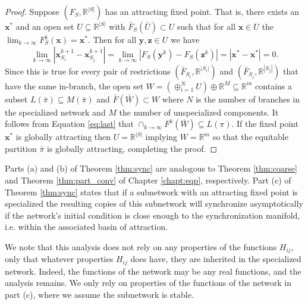 \documentclass[12pt]{thesis}
\begin{document}
\begin{proof}
Suppose $(F_{S},\mathbb{R}^{|S|})$ has an attracting fixed point.
That is, there exists an $\mathbf{x}^*$ and an open set $U\subseteq\mathbb{R}^{|S|}$ with $\bar{F}_S(\bar{U})\subset U$ such that for all {$\mathbf{x}\in U$ the $\lim_{k\rightarrow\infty}F_S^k(\mathbf{x})=\mathbf{x}^*$}. Then for all $\mathbf{y},\mathbf{z}\in U$ we have 
\begin{equation}\label{eq:last}
\lim_{k\rightarrow\infty}\left|\mathbf{x}_{S_i}^{k+1} - \mathbf{x}_{S_j}^{k+1}\right| = \lim_{k\rightarrow\infty}\left|F_{S}(\mathbf{y}^k) - F_{S}(\mathbf{z}^k)\right|=|\mathbf{x}^*-\mathbf{x}^*|=0.
\end{equation}
Since this is true for every pair of restrictions $(\bar{F}_{S_i},\mathbb{R}^{|S_i|})$ and $(\bar{F}_{S_j},\mathbb{R}^{|S_j|})$ that have the same in-branch, the open set $W=(\oplus_{i=1}^N U)\oplus\mathbb{R}^M\subseteq\mathbb{R}^m$ contains a subset $L(\bar{\pi})\subseteq M(\bar{\pi})$ and $\bar{F}(\bar{W})\subset W$ where $N$ is the number of branches in the specialized network and $M$ the number of unspecialized components.
It follows from Equation \eqref{eq:last} that $\cap_{k\rightarrow\infty}F^k(\bar{W}) \subseteq L(\pi)$.
If the fixed point $\mathbf{x}^*$ is globally attracting then $U=\mathbb{R}^{|S|}$ implying $W=\mathbb{R}^m$ so that the equitable partition $\bar{\pi}$ is globally attracting, completing the proof.
\end{proof}

Parts (a) and (b) of Theorem \ref{thm:sync} are analogous to Theorem \ref{thm:coarse} and Theorem \ref{thm:part_conv} of Chapter \ref{chapt:eqp}, respectively.
Part (c) of Theorem \ref{thm:sync} states that if a subnetwork with an attracting fixed point is specialized the resulting copies of this subnetwork will synchronize asymptotically if the network's initial condition is close enough to the synchronization manifold, i.e. within the associated basin of attraction.

We note that this analysis does not rely on any properties of the functions $H_{ij}$, only that whatever properties $H_{ij}$ does have, they are inherited in the specialized network.
Indeed, the functions of the network may be any real functions, and the analysis remains.
We only rely on properties of the functions of the network in part (c), where we assume the subnetwork is stable.
\end{document}
